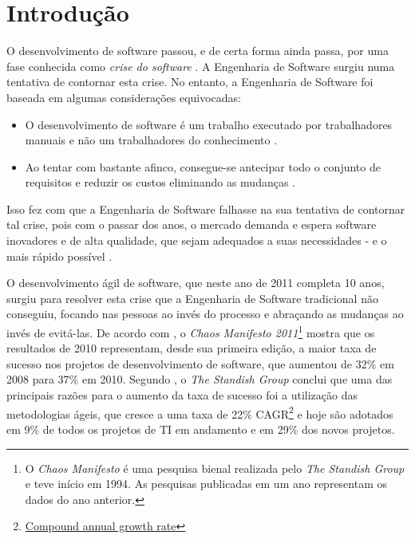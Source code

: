 \chapter{Introdução}

O desenvolvimento de software passou, e de certa forma ainda passa, por uma fase
conhecida como \emph{crise do software} \cite{HumbleProgrammer}. A Engenharia de
Software surgiu \cite{NaurRandell} numa tentativa de contornar esta crise. No
entanto, a Engenharia de Software foi baseada em algumas considerações
equivocadas:

\begin{itemize}
    \item
        O desenvolvimento de software é um trabalho executado por trabalhadores
        manuais e não um trabalhadores do conhecimento \cite[38]{XPTeles}.
    \item
        Ao tentar com bastante afinco, consegue-se antecipar todo o conjunto de
        requisitos e reduzir os custos eliminando as mudanças
        \cite{TheBusinessOfInnovation}.
\end{itemize}

Isso fez com que a Engenharia de Software falhasse na sua tentativa de contornar
tal crise, pois com o passar dos anos, o mercado demanda e espera software
inovadores e de alta qualidade, que sejam adequados a suas necessidades - e o
mais rápido possível \cite{TheBusinessOfInnovation}.

O desenvolvimento ágil de software, que neste ano de 2011 completa 10 anos,
surgiu \cite{AgileManifesto} para resolver esta crise que a Engenharia de
Software tradicional não conseguiu, focando nas pessoas ao invés do processo e
abraçando as mudanças ao invés de evitá-las. De acordo com
, o \textit{Chaos Manifesto 2011}\footnote{O
\textit{Chaos Manifesto} é uma pesquisa bienal realizada pelo \textit{The
Standish Group} e teve início em 1994. As pesquisas publicadas em um ano
representam os dados do ano anterior.} mostra que os resultados de 2010
representam, desde sua primeira edição, a maior taxa de sucesso nos projetos de
desenvolvimento de software, que aumentou de 32\% em 2008 para 37\% em 2010.
Segundo , o \textit{The Standish Group} conclui
que uma das principais razões para o aumento da taxa de sucesso foi a utilização
das metodologias ágeis, que cresce a uma taxa de 22\%
CAGR\footnote{\href{http://en.wikipedia.org/wiki/Compound_annual_growth_rate}
{Compound annual growth rate}} e hoje são adotados em 9\% de todos os projetos
de TI em andamento e em 29\% dos novos projetos.

